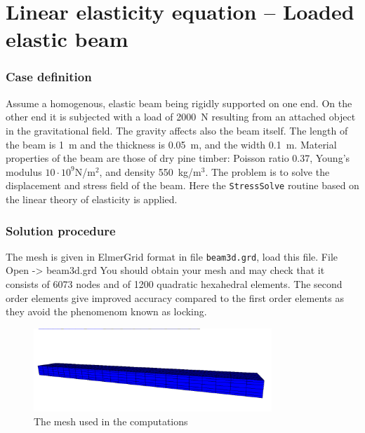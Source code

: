 \chapter{Linear elasticity equation -- Loaded elastic beam}



\subsection*{Case definition}

Assume a homogenous, elastic beam being rigidly supported on one 
end. On the other end it is subjected with a load of 2000~N
resulting from an attached object in the gravitational field. The gravity affects also the beam itself.
The length of the beam is 1~m and the thickness is 0.05~m, and the width 
0.1~m.
Material properties of the beam are those of dry pine timber:
Poisson 
ratio 0.37, Young's modulus $10\cdot 10^9$N/m$^2$, and density 550~kg/m$^3$. 
The problem is to solve the displacement and stress field of the beam.  
Here the \texttt{StressSolve} routine based on the 
linear theory of elasticity is applied.


\subsection*{Solution procedure}

The mesh is given in ElmerGrid format in file \texttt{beam3d.grd}, load this file.
\ttbegin
File 
  Open -> beam3d.grd
\ttend
You should obtain your mesh and may check that it consists of 6073 nodes and of 
1200 quadratic hexahedral elements. The second order elements give
improved accuracy compared to the first order elements as they avoid the phenomenom known as locking.
\begin{figure}[h!]
\begin{center}
  \includegraphics[width=0.8\textwidth,viewport=0 0 1230 300,clip]{beam_mesh}
  \caption{The mesh used in the computations}
  \label{fig:elast_mesh}
\end{center}
\end{figure}

